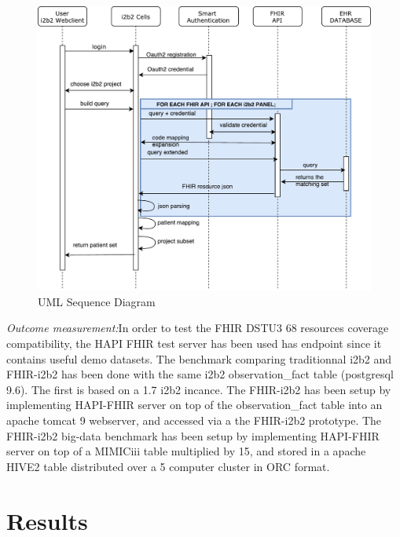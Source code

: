 \documentclass{amia}
\begin{document}
\begin{figure}[h!]
\centering
\includegraphics[scale=.5]{diagram_sequence.pdf}
\caption{UML Sequence Diagram}
\label{fig1}
\end{figure}


\textit{Outcome measurement:}In order to test the FHIR DSTU3 68 resources coverage compatibility, the HAPI FHIR test server has been used has endpoint since it contains useful demo datasets. The benchmark comparing traditionnal i2b2 and FHIR-i2b2 has been done with the same i2b2 observation\_fact table (postgresql 9.6). The first is based on a 1.7 i2b2 incance. The FHIR-i2b2 has been setup by implementing HAPI-FHIR server on top of the observation\_fact table into an apache tomcat 9 webserver, and accessed via a the FHIR-i2b2 prototype. The FHIR-i2b2 big-data benchmark has been setup by implementing HAPI-FHIR server on top of a MIMICiii table multiplied by 15, and stored in a apache HIVE2 table distributed over a 5 computer cluster in ORC format.

\section*{Results}
\end{document}
